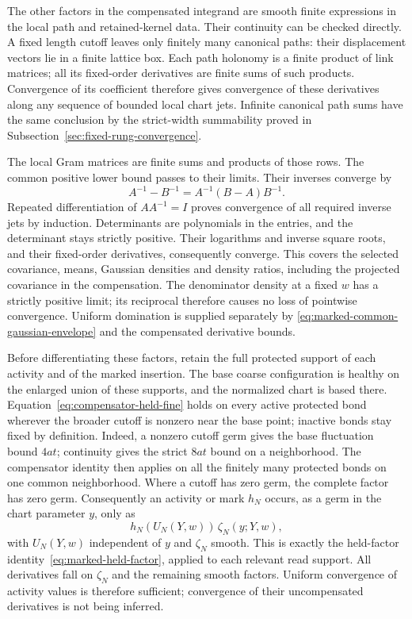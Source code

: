 The other factors in the compensated integrand are smooth finite
expressions in the local path and retained-kernel data. Their
continuity can be checked directly. A fixed length cutoff leaves
only finitely many canonical paths: their displacement vectors
lie in a finite lattice box. Each path holonomy is a finite
product of link matrices; all its fixed-order derivatives are
finite sums of such products. Convergence of its coefficient
therefore gives convergence of these derivatives along any
sequence of bounded local chart jets. Infinite canonical path
sums have the same conclusion by the strict-width summability
proved in Subsection~\ref{sec:fixed-rung-convergence}.

The local Gram matrices are finite sums and products of those
rows. The common positive lower bound passes to their limits.
Their inverses converge by
\[
              A^{-1}-B^{-1}=A^{-1}(B-A)B^{-1}.
\]
Repeated differentiation of $A A^{-1}=I$ proves convergence
of all required inverse jets by induction. Determinants are
polynomials in the entries, and the determinant stays strictly
positive. Their logarithms and inverse square roots, and their
fixed-order derivatives, consequently converge. This covers
the selected covariance, means, Gaussian densities and density
ratios, including the projected covariance in the compensation.
The denominator density at a fixed $w$ has a strictly positive
limit; its reciprocal therefore causes no loss of pointwise
convergence. Uniform domination is supplied separately by
\eqref{eq:marked-common-gaussian-envelope} and the compensated
derivative bounds.

Before differentiating these factors, retain the full protected
support of each activity and of the marked insertion. The base coarse
configuration is healthy on the enlarged union of these supports,
and the normalized chart is based there. Equation~\eqref{eq:compensator-held-fine}
holds on every active protected bond wherever the broader cutoff
is nonzero near the base point; inactive bonds stay fixed by definition.
Indeed, a nonzero cutoff germ gives the base fluctuation bound $4at$;
continuity gives the strict $8at$ bound on a neighborhood. The
compensator identity then applies on all the finitely many protected
bonds on one common neighborhood. Where a cutoff has zero germ,
the complete factor has zero germ. Consequently an activity or mark
$h_N$ occurs, as a germ in the chart parameter $y$, only as
\[
                         h_N(U_N(Y,w))\,\zeta_N(y;Y,w),
\]
with $U_N(Y,w)$ independent of $y$ and $\zeta_N$ smooth. This is
exactly the held-factor identity~\eqref{eq:marked-held-factor},
applied to each relevant read support. All derivatives fall on
$\zeta_N$ and the remaining smooth factors. Uniform convergence
of activity values is therefore sufficient; convergence of their
uncompensated derivatives is not being inferred.

